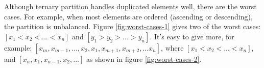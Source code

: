 \documentclass[b5paper]{article}
\begin{document}
Although ternary partition handles duplicated elements well, there are the worst cases. For example, when most elements are ordered (ascending or descending), the partition is unbalanced. Figure \cref{fig:worst-cases-1} gives two of the worst cases: $[x_1 < x_2 < ... < x_n]$ and $[y_1 > y_2 > ... > y_n]$. It's easy to give more, for example: $[x_m, x_{m-1}, ..., x_2, x_1, x_{m+1}, x_{m+2}, ... x_n]$, where $[ x_1 < x_2 < ... < x_n]$, and $[x_n, x_1, x_{n-1}, x_2, ... ]$ as shown in figure \cref{fig:worst-cases-2}.

\begin{figure}[htbp]
   \centering
    \\

\end{figure}
\end{document}
